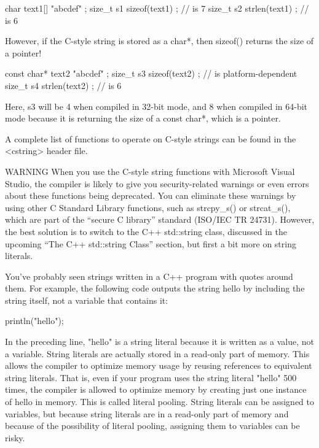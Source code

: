 \begin{cpp}
char text1[] { "abcdef" };
size_t s1 { sizeof(text1) }; // is 7
size_t s2 { strlen(text1) }; // is 6
\end{cpp}

However, if the C-style string is stored as a char*, then sizeof() returns the size of a pointer!

\begin{cpp}
const char* text2 { "abcdef" };
size_t s3 { sizeof(text2) }; // is platform-dependent
size_t s4 { strlen(text2) }; // is 6
\end{cpp}

Here, s3 will be 4 when compiled in 32-bit mode, and 8 when compiled in 64-bit mode because it is returning the size of a const char*, which is a pointer.

A complete list of functions to operate on C-style strings can be found in the <cstring> header file.

\begin{myWarning}{WARNING}
When you use the C-style string functions with Microsoft Visual Studio, the compiler is likely to give you security-related warnings or even errors about these functions being deprecated. You can eliminate these warnings by using other C Standard Library functions, such as strcpy\_s() or strcat\_s(), which are part of the “secure C library” standard (ISO/IEC TR 24731). However, the best solution is to switch to the C++ std::string class, discussed in the upcoming “The C++ std::string Class” section, but first a bit more on string literals.
\end{myWarning}


You’ve probably seen strings written in a C++ program with quotes around them. For example, the following code outputs the string hello by including the string itself, not a variable that contains it:

\begin{cpp}
println("hello");
\end{cpp}

In the preceding line, "hello" is a string literal because it is written as a value, not a variable. String literals are actually stored in a read-only part of memory. This allows the compiler to optimize memory usage by reusing references to equivalent string literals. That is, even if your program uses the string literal "hello" 500 times, the compiler is allowed to optimize memory by creating just one instance of hello in memory. This is called literal pooling.
String literals can be assigned to variables, but because string literals are in a read-only part of memory and because of the possibility of literal pooling, assigning them to variables can be risky.

